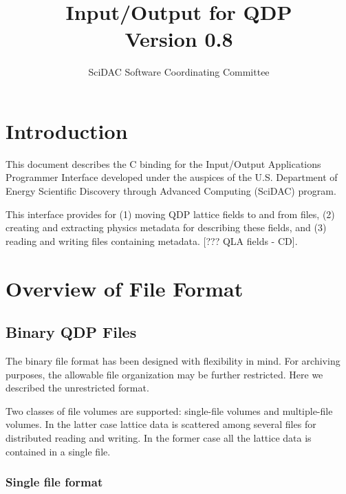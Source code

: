 \documentclass{article}
\begin{document}
\title{
   Input/Output for QDP \\{\large Version 0.8}
}
\author{ SciDAC Software Coordinating Committee}

\maketitle
\section{Introduction}
This document describes the C binding for the Input/Output
Applications Programmer Interface developed under the auspices of the
U.S. Department of Energy Scientific Discovery through Advanced
Computing (SciDAC) program.

This interface provides for (1) moving QDP lattice fields to and from
files, (2) creating and extracting physics metadata for describing
these fields, and (3) reading and writing files containing metadata.
[??? QLA fields - CD].

\section{Overview of File Format}
\label{sec.fileformat}

\subsection{Binary QDP Files}

The binary file format has been designed with flexibility in mind. For
archiving purposes, the allowable file organization may be further
restricted.  Here we described the unrestricted format.

Two classes of file volumes are supported: single-file volumes and
multiple-file volumes.  In the latter case lattice data is scattered
among several files for distributed reading and writing.  In the
former case all the lattice data is contained in a single file.

\subsubsection{Single file format}
\end{document}
